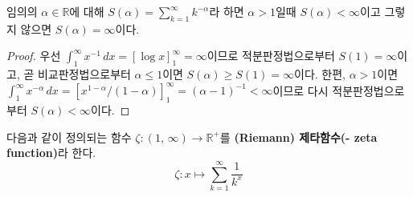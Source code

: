 \begin{proposition}
    임의의 $\alpha\in\mathbb{R}$에 대해 $S(\alpha)=\sum_{k=1}^\infty k^{-\alpha}$라 하면 $\alpha>1$일때 $S(\alpha)<\infty$이고 그렇지 않으면 $S(\alpha)=\infty$이다.
\end{proposition}

\begin{proof}
    우선 $\int_1^\infty x^{-1}\,dx=[\log x]_1^\infty=\infty$이므로 적분판정법으로부터 $S(1)=\infty$이고, 곧 비교판정법으로부터 $\alpha\leq1$이면 $S(\alpha)\geq S(1)=\infty$이다. 한편, $\alpha>1$이면 $\int_1^\infty x^{-\alpha}\,dx=[x^{1-\alpha}/(1-\alpha)]^\infty_1=(\alpha-1)^{-1}<\infty$이므로 다시 적분판정법으로부터 $S(\alpha)<\infty$이다.
\end{proof}

\begin{definition}
    다음과 같이 정의되는 함수 $\zeta:(1,\,\infty)\to\mathbb{R}^+$를 \textbf{(Riemann) 제타함수(- zeta function)}라 한다.
    \begin{equation*}
        \zeta:x\mapsto\sum_{k=1}^\infty\frac{1}{k^x}
    \end{equation*}
\end{definition}

